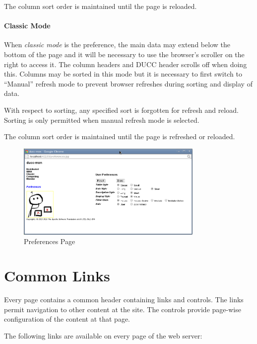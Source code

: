     The column sort order is maintained until the page is reloaded.

    \paragraph{Classic Mode}  When {\em classic mode} is the preference, the
    main data may extend below the bottom of the page and it will be necessary to use the browser's scroller on the right
    to access it.  The column headers and DUCC header scrolls off when doing this.  Columns
    may be sorted in this mode but it is necessary to first switch to ``Manual'' refresh mode to
    prevent browser refreshes during sorting and display of data. 
    
    With respect to sorting, any specified sort is forgotten for refresh
    and reload.  Sorting is only permitted when manual refresh mode is
    selected.
    
    The column sort order is maintained until the page is refreshed or reloaded.

\begin{figure}[ht!]
\centering
\includegraphics[width=90mm]{images/ducc-webserver/Preferences.png}
\caption{Preferences Page}
\label{overflow}
\end{figure}

\ifpdf
\else
{}
\fi
    \section{Common Links}

        Every page contains a common header containing links and controls. The links permit navigation
        to other content at the site. The controls provide page-wise configuration of the content at
        that page.

        The following links are available on every page of the web server: 


